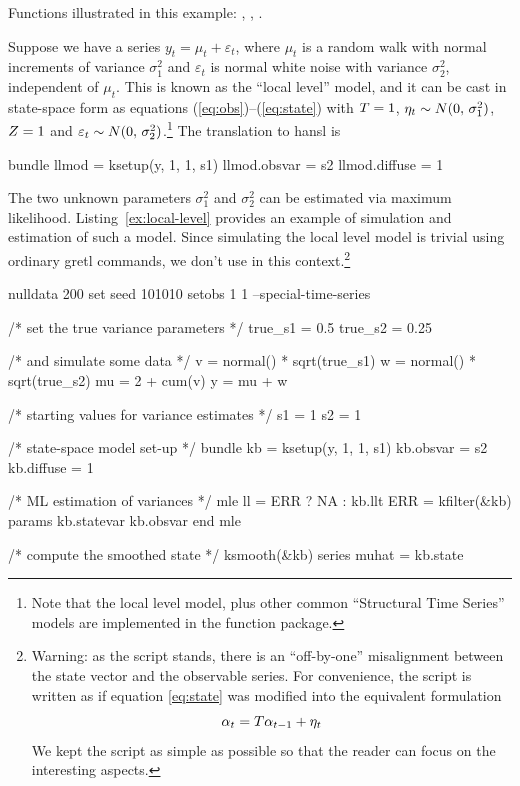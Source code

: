 Functions illustrated in this example: , ,
.

Suppose we have a series $y_t = \mu_t + \varepsilon_t$, where $\mu_t$
is a random walk with normal increments of variance $\sigma^2_1$ and
$\varepsilon_t$ is normal white noise with variance $\sigma^2_2$,
independent of $\mu_t$. This is known as the ``local level'' model,
and it can be cast in state-space form as equations
(\ref{eq:obs})--(\ref{eq:state}) with $T = 1$, $\eta_t \sim
N(0,\, \sigma^2_1)$, $Z = 1$ and $\varepsilon_t \sim N(0,\,
\sigma^2_2)$.\footnote{Note that the local level model, plus other
  common ``Structural Time Series'' models are implemented in the
   function package.} The translation to \textsf{hansl}
is
\begin{code}
bundle llmod = ksetup(y, 1, 1, s1)
llmod.obsvar = s2
llmod.diffuse = 1
\end{code}

The two unknown parameters $\sigma^2_1$ and $\sigma^2_2$ can be
estimated via maximum likelihood.  Listing~\ref{ex:local-level} provides
an example of simulation and estimation of such a model. Since
simulating the local level model is trivial using ordinary gretl
commands, we don't use  in this context.\footnote{Warning:
  as the script stands, there is an ``off-by-one'' misalignment
  between the state vector and the observable series. For convenience,
  the script is written as if equation \eqref{eq:state} was modified
  into the equivalent formulation
  \[
  \alpha_{t} = T \alpha_{t-1} + \eta_t
  \]
  We kept the script as simple as possible so that the reader can
  focus on the interesting aspects.}

\begin{script}[htbp]
\begin{scode}
nulldata 200
set seed 101010
setobs 1 1 --special-time-series

/* set the true variance parameters */
true_s1 = 0.5
true_s2 = 0.25

/* and simulate some data */
v = normal() * sqrt(true_s1)
w = normal() * sqrt(true_s2)
mu = 2 + cum(v)
y = mu + w

/* starting values for variance estimates */
s1 = 1
s2 = 1

/* state-space model set-up */
bundle kb = ksetup(y, 1, 1, s1)
kb.obsvar = s2
kb.diffuse = 1

/* ML estimation of variances */
mle ll = ERR ? NA : kb.llt
    ERR = kfilter(&kb)
    params kb.statevar kb.obsvar
end mle

/* compute the smoothed state */
ksmooth(&kb)
series muhat = kb.state
\end{scode}
\end{script}

